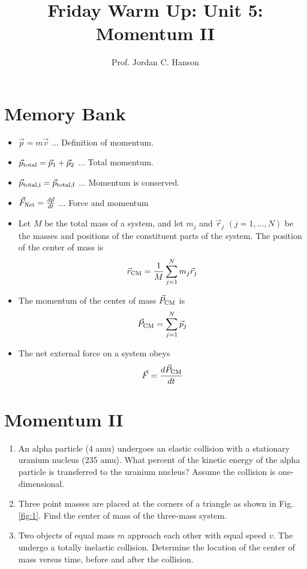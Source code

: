 \documentclass{article}
\begin{document}
\twocolumn

\title{Friday Warm Up: Unit 5: Momentum II}
\author{Prof. Jordan C. Hanson}

\maketitle

\section{Memory Bank}

\begin{itemize}
\item $\vec{p} = m\vec{v}$ ... Definition of momentum.
\item $\vec{p}_{\rm total} = \vec{p}_1 + \vec{p}_2$ ... Total momentum.
\item $\vec{p}_{\rm total,i} = \vec{p}_{\rm total,f}$ ... Momentum is conserved.
\item $\vec{F}_{\rm Net} = \frac{d\vec{p}}{dt}$ ... Force and momentum
\item Let $M$ be the total mass of a system, and let $m_j$ and $\vec{r}_j$ $(j = 1,...,N)$ be the masses and positions of the constituent parts of the system.  The position of the center of mass is
\begin{equation}
\vec{r}_{\rm CM} = \frac{1}{M}\sum_{j=1}^{N}m_j \vec{r}_j
\end{equation}
\item The momentum of the center of mass $\vec{P}_{\rm CM}$ is
\begin{equation}
\vec{P}_{\rm CM} = \sum_{j=1}^N \vec{p}_j
\end{equation}
\item The net external force on a system obeys
\begin{equation}
\vec{F} = \frac{d\vec{P}_{\rm CM}}{dt}
\end{equation}
\end{itemize}

\section{Momentum II}

\begin{enumerate}
\item An alpha particle (4 amu) undergoes an elastic collision with a stationary uranium nucleus (235 amu).  What percent of the kinetic energy of the alpha particle is transferred to the uranium nucleus? Assume the collision is one-dimensional. \\ \vspace{4cm}
\item Three point masses are placed at the corners of a triangle as shown in Fig. \ref{fig:1}.  Find the center of mass of the three-mass system. \\ \vspace{3cm}
\item Two objects of equal mass $m$ approach each other with equal speed $v$.  The undergo a totally inelastic collision.  Determine the location of the center of mass versus time, before and after the collision.
\end{enumerate}
\end{document}
